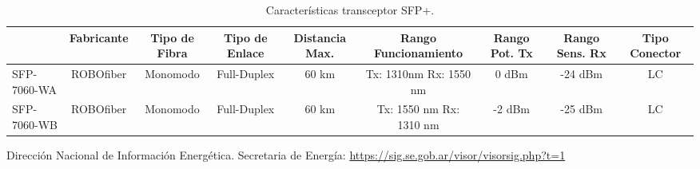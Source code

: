 \begin{table}[H]
  \tiny
  \centering
    \begin{tabular}{|l|c|c|c|c|c|c|c|c|}
    \hline
    \rowcolor[rgb]{ .773,  .851,  .945} \multicolumn{1}{|c|}{\textbf{Modelo}} & \textbf{Fabricante} & \textbf{Tipo de Fibra} & \textbf{Tipo de Enlace} & \textbf{Distancia Max.} & \textbf{Rango Funcionamiento} & \textbf{Rango Pot. Tx} & \textbf{Rango Sens. Rx} & \textbf{Tipo Conector} \bigstrut\\
    \hline
    \textcolor[rgb]{ .004,  .004,  .004}{SFP-7060-WA} & ROBOfiber & Monomodo & Full-Duplex & 60 km & Tx: 1310nm   Rx: 1550 nm & 0 dBm & -24 dBm & LC \bigstrut\\
    \hline
    \textcolor[rgb]{ .004,  .004,  .004}{SFP-7060-WB} & ROBOfiber & Monomodo & Full-Duplex & 60 km & Tx: 1550 nm  Rx: 1310 nm & -2 dBm & -25 dBm & LC \bigstrut\\
    \hline
    \end{tabular}%
    \caption{Características transceptor SFP+.}
  \label{tab:caracteristicas-SFP+}%
\end{table}%







\newpage

\begin{thebibliography}{99}
Dirección Nacional de Información Energética. Secretaria de Energía: \url{https://sig.se.gob.ar/visor/visorsig.php?t=1}

\end{thebibliography}


\newpage